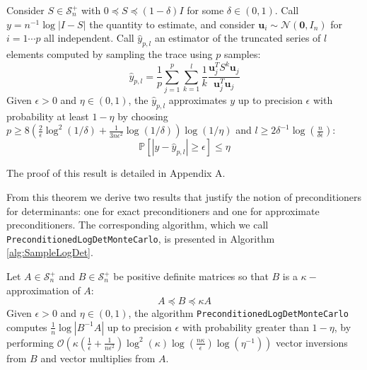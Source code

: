 \begin{theorem} \label{thm:det-sampling-theorem}Consider $S\in\mathcal{S}_{n}^{+}$
with $0\preceq S\preceq\left(1-\delta\right)I$ for some $\delta\in\left(0,1\right)$.
Call $y=n^{-1}\log\left|I-S\right|$ the quantity to estimate, and
consider $\mathbf{u}_{i}\sim\mathcal{N}\left(\mathbf{0},I_{n}\right)$
for $i=1\cdots p$ all independent. Call $\hat{y}_{p,l}$ an estimator
of the truncated series of $l$ elements computed by sampling the
trace using $p$ samples: 
\[
\hat{y}_{p,l}=\frac{1}{p}\sum_{j=1}^{p}\sum_{k=1}^{l}\frac{1}{k}\frac{\mathbf{u}_{j}^{T}S^{k}\mathbf{u}_{j}}{\mathbf{u}_{j}^{T}\mathbf{u}_{j}}
\]
Given $\epsilon>0$ and $\eta\in\left(0,1\right)$, the $\hat{y}_{p,l}$
approximates $y$ up to precision $\epsilon$ with probability at
least $1-\eta$ by choosing $p\geq8\left(\frac{2}{\epsilon}\log^{2}\left(1/\delta\right)+\frac{1}{3n\epsilon^{2}}\log\left(1/\delta\right)\right)\log\left(1/\eta\right)$
and $l\geq2\delta^{-1}\log\left(\frac{n}{\delta\epsilon}\right)$:
\[
\mathbb{P}\left[\left|y-\hat{y}_{p,l}\right|\geq\epsilon\right]\leq\eta
\]
\end{theorem}

The proof of this result is detailed in Appendix A.

From this theorem we derive two results that justify the notion of
preconditioners for determinants: one for exact preconditioners and
one for approximate preconditioners. The corresponding algorithm,
which we call \texttt{PreconditionedLogDetMonteCarlo}, is presented
in Algorithm \ref{alg:SampleLogDet}.

\begin{corollary} \label{cor:preconditioning}Let $A\in\mathcal{S}_{n}^{+}$
and $B\in\mathcal{S}_{n}^{+}$ be positive definite matrices so that
$B$ is a $\kappa-$approximation of $A$: 
\begin{equation}
A\preceq B\preceq\kappa A\label{eq:A-B-bounds}
\end{equation}
Given $\epsilon>0$ and $\eta\in\left(0,1\right)$, the algorithm
\texttt{PreconditionedLogDetMonteCarlo} computes $\frac{1}{n}\log\left|B^{-1}A\right|$
up to precision $\epsilon$ with probability greater than $1-\eta$,
by performing $\mathcal{O}\left(\kappa\left(\frac{1}{\epsilon}+\frac{1}{n\epsilon^{2}}\right)\log^{2}\left(\kappa\right)\log\left(\frac{n\kappa}{\epsilon}\right)\log\left(\eta^{-1}\right)\right)$
vector inversions from $B$ and vector multiplies from $A$.

\end{corollary}

